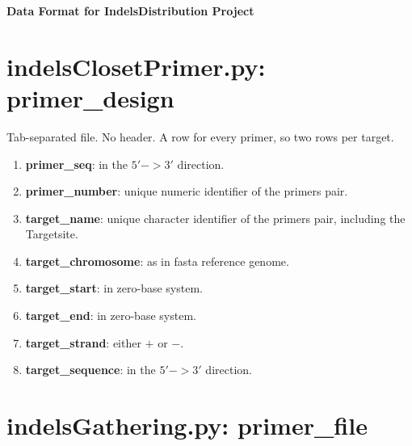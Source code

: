 \documentclass[11pt, twoside]{article}
\begin{document}
\thispagestyle{plain}

{\Large
\begin{center}
{\bf Data Format for IndelsDistribution Project}
\end{center}
}

\tableofcontents
\newpage
\section{indelsClosetPrimer.py: primer\_design} 

Tab-separated file. No header.
A row for every primer, so two rows per target. 

\begin{enumerate}
\item {\bf primer\_seq}: in the $5' -> 3'$ direction. 

\item {\bf primer\_number}: unique numeric identifier of the primers pair. 

\item {\bf target\_name}: unique character identifier of the primers
  pair, including the Targetsite. 

\item {\bf target_chromosome}: as in fasta reference genome.

\item {\bf target\_start}: in zero-base system. 

\item {\bf target\_end}: in zero-base system. 

\item {\bf target\_strand}: either $+$ or $-$. 

\item {\bf target\_sequence}: in the $5' -> 3'$ direction.
\end{enumerate}

\vspace{1cm}
\section{indelsGathering.py: primer\_file}
\end{document}
